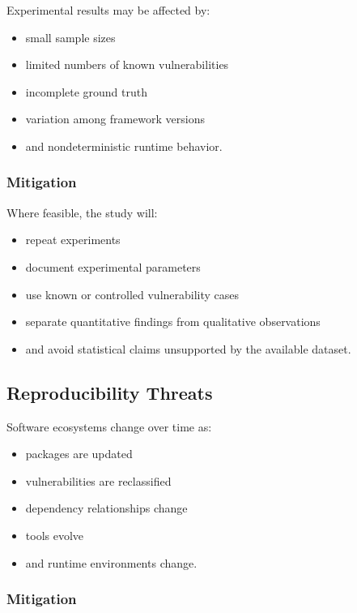 \documentclass[
  12pt,
  letterpaper,
  oneside]{report}
\providecommand{\tightlist}{%
  \setlength{\itemsep}{0pt}\setlength{\parskip}{0pt}}
\begin{document}
Experimental results may be affected by:

\begin{itemize}
\tightlist
\item
  small sample sizes
\item
  limited numbers of known vulnerabilities
\item
  incomplete ground truth
\item
  variation among framework versions
\item
  and nondeterministic runtime behavior.
\end{itemize}

\subsubsection{Mitigation}\label{mitigation-3}

Where feasible, the study will:

\begin{itemize}
\tightlist
\item
  repeat experiments
\item
  document experimental parameters
\item
  use known or controlled vulnerability cases
\item
  separate quantitative findings from qualitative observations
\item
  and avoid statistical claims unsupported by the available dataset.
\end{itemize}

\subsection{Reproducibility Threats}\label{1185-reproducibility-threats}

Software ecosystems change over time as:

\begin{itemize}
\tightlist
\item
  packages are updated
\item
  vulnerabilities are reclassified
\item
  dependency relationships change
\item
  tools evolve
\item
  and runtime environments change.
\end{itemize}

\subsubsection{Mitigation}\label{mitigation-4}
\end{document}

